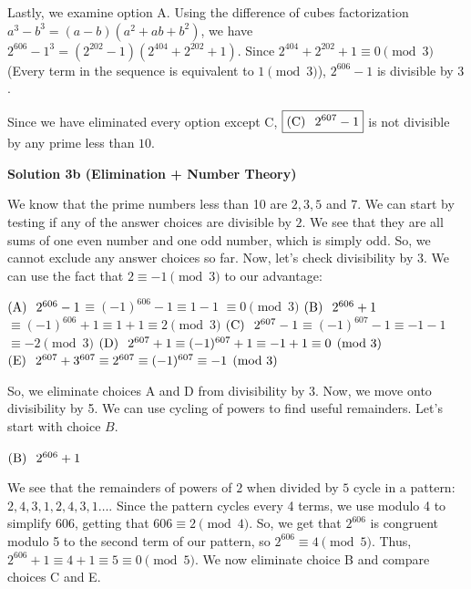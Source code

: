 \begin{enumerate}
 Lastly, we examine option A. Using the difference of cubes factorization $a^3-b^3=(a-b)(a^2+ab+b^2)$, we have $2^{606}-1^3=(2^{202}-1)(2^{404}+2^{202}+1)$. Since $2^{404}+2^{202}+1\equiv0\pmod{3}$ (Every term in the sequence is equivalent to $1\pmod{3}$), $2^{606}-1$ is divisible by $3$.

 Since we have eliminated every option except C, $\boxed{\text{(C)} \hspace{0.1 in}2^{607}-1}$ is not divisible by any prime less than $10$.

 



\textbf{Solution 3b (Elimination + Number Theory)}

We know that the prime numbers less than 10 are $2,3,5$ and $7$. We can start by testing if any of the answer choices are divisible by $2$. We see that they are all sums of one even number and one odd number, which is simply odd. So, we cannot exclude any answer choices so far. Now, let's check divisibility by $3$. We can use the fact that $2 \equiv -1 \pmod{3}$ to our advantage: 

 


 $(\text{A})\hspace{0.1in} 2^{606}-1$$\equiv (-1)^{606} -1$$\equiv 1-1$ $\equiv 0 \pmod{3}$
$(\text{B}) \hspace{0.1in} 2^{606}+1$$\equiv (-1)^{606} +1$$\equiv 1+1$$\equiv 2 \pmod{3}$
$(\text{C})\hspace{0.1in} 2^{607}-1$$\equiv (-1)^{607} -1$$\equiv -1 - 1$$\equiv -2 \pmod{3}$
$(\text{D})\hspace{0.1in} 2^{607} +1 \equiv (-1)^{607} +1 \equiv -1+1 \equiv 0 \pmod{3}$
$(\text{E}) \hspace{0.1in}  2^{607} + 3^{607} \equiv 2^{607} \equiv (-1)^{607} \equiv -1 \pmod{3}$

 
So, we eliminate choices A and D from divisibility by 3. Now, we move onto divisibility by 5. We can use cycling of powers to find useful remainders. Let's start with choice $B$. 

 


 $(\text{B}) \hspace{0.1in} 2^{606}+1$ 

 


 We see that the remainders of powers of $2$ when divided by $5$ cycle in a pattern: $2,4,3,1,2,4,3,1 \dots$. Since the pattern cycles every 4 terms, we use modulo 4 to simplify 606, getting that $606 \equiv 2\pmod{4}$. So, we get that $2^{606}$ is congruent modulo 5 to the second term of our pattern, so $2^{606} \equiv{4} \pmod{5}$. Thus, $2^{606}+1 \equiv 4+1 \equiv 5\equiv 0\pmod{5}$. We now eliminate choice B and compare choices C and E.  


\end{enumerate}
